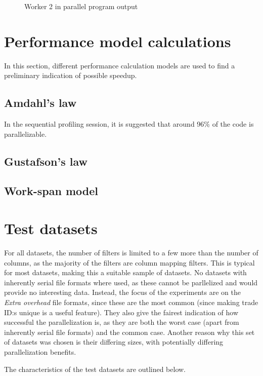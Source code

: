 \begin{figure}[ht]
  
  \caption{Worker 2 in parallel program  output}
  \label{fig:parallel_profiler_w2}
\end{figure}
\clearpage

\section{Performance model calculations}
In this section, different performance calculation models are used to find a preliminary
indication of possible speedup.

\subsection{Amdahl's law}
In the sequential profiling session, it is suggested that around 96\% of the code is parallelizable.

\subsection{Gustafson's law}

\subsection{Work-span model}


\section{Test datasets}
For all datasets, the number of filters is limited to a few more than the number of columns, as the majority of the filters are column mapping filters.
This is typical for most datasets, making this a suitable sample of datasets. No datasets with inherently serial file formats where used, as these cannot be
parllelized and would provide no interesting data. Instead, the focus of the experiments are on the \textit{Extra overhead} file formats, since these are the
most common (since making trade ID:s unique is a useful feature). They also give the fairest indication of how successful the parallelization is, as they are
both the worst case (apart from inherently serial file formats) and the common case. Another reason why this set of datasets was chosen is their differing sizes,
with potentially differing parallelization benefits.

The characteristics of the test datasets are outlined below.

